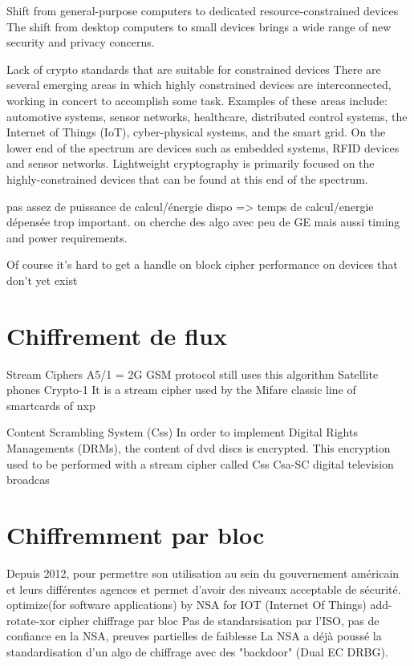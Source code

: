 \documentclass{article}
\begin{document}
Shift from general-purpose computers to dedicated resource-constrained devices
The shift from desktop computers to small devices brings a wide range of new security and privacy concerns.

Lack of crypto standards that are suitable for constrained devices
There are several emerging areas in which highly constrained devices are interconnected, working in concert to accomplish some task.
Examples of these areas include: automotive systems, sensor networks,  healthcare,  distributed  control  systems,
the  Internet  of  Things (IoT),  cyber-physical systems,  and  the  smart  grid.
On the lower end of the spectrum are devices such as embedded systems, RFID devices and sensor networks.
Lightweight cryptography is primarily focused on the highly-constrained devices that can be found at this end of the spectrum.

pas assez de puissance de calcul/énergie dispo => temps de calcul/energie dépensée trop important.
on cherche des algo avec peu de GE mais aussi timing and power requirements.

Of course it’s hard to get a handle on block cipher performance on devices that don’t yet exist



\section{Chiffrement de flux}

Stream Ciphers
A5/1 = 2G GSM protocol still uses this algorithm
Satellite phones
Crypto-1 It is a stream cipher used by the Mifare classic line of smartcards of nxp

Content Scrambling System (Css) In order to implement Digital Rights Managements (DRMs), the content of dvd discs is encrypted.
This encryption used to be performed with a stream cipher called Css
Csa-SC digital television broadcas

\section{Chiffremment par bloc}

Depuis 2012, pour permettre son utilisation au sein du gouvernement américain et leurs différentes agences et permet d'avoir des niveaux acceptable de sécurité.
optimize(for software applications) by NSA for IOT (Internet Of Things)
add-rotate-xor cipher
chiffrage par bloc
Pas de standarsisation par l'ISO, pas de confiance en la NSA, preuves partielles de faiblesse
La NSA a déjà poussé la standardisation d'un algo de chiffrage avec des "backdoor" (Dual EC DRBG).
\end{document}
